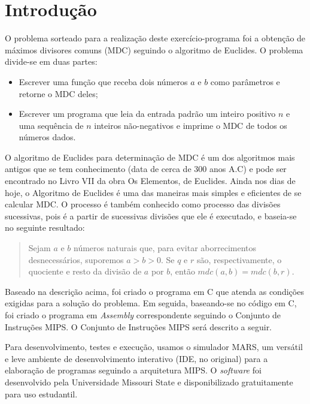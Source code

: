 \chapter{Introdução}

O problema sorteado para a realização deste exercício-programa foi a obtenção de máximos divisores comuns (MDC) seguindo o algoritmo de Euclides. O problema divide-se em duas partes:

\begin{itemize}
\item Escrever uma função que receba dois números $a$ e $b$ como parâmetros e retorne o MDC deles;
\item Escrever um programa que leia da entrada padrão um inteiro positivo $n$ e uma sequência de $n$ inteiros não-negativos e imprime o MDC de todos os números dados.\\
\end{itemize}

O algoritmo de Euclides para determinação de MDC é um dos algoritmos  mais antigos que se tem conhecimento (data de cerca de 300 anos A.C) e pode ser encontrado no Livro VII da obra Os Elementos, de Euclides. Ainda nos dias de hoje, o Algoritmo de Euclides é uma das maneiras mais simples e eficientes de se calcular MDC. O processo é também conhecido como processo das divisões sucessivas, pois é a partir de sucessivas divisões que ele é executado, e baseia-se no seguinte resultado:\\

\begin{quote}
Sejam $a$ e $b$ números naturais que, para evitar aborrecimentos desnecessários, suporemos $a > b > 0$. Se $q$ e $r$ são, respectivamente, o quociente e resto da divisão de $a$ por $b$, então $mdc(a, b) = mdc(b, r)$.\\
\end{quote}

Baseado na descrição acima, foi criado o programa em C que atenda as condições exigidas para a solução do problema. Em seguida, baseando-se no código em C, foi criado o programa em \textit{Assembly} correspondente seguindo o Conjunto de Instruções MIPS. O Conjunto de Instruções MIPS será descrito a seguir.

Para desenvolvimento, testes e execução, usamos o simulador MARS, um versátil e leve ambiente de desenvolvimento interativo (IDE, no original) para a elaboração de programas seguindo a arquitetura MIPS. O \textit{software} foi desenvolvido pela Universidade Missouri State e disponibilizado gratuitamente para uso estudantil.
